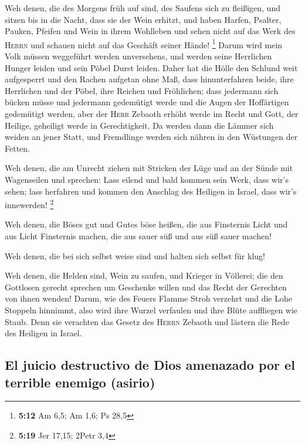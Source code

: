  Weh denen, die des Morgens früh auf sind, des Saufens
sich zu fleißigen, und sitzen bis in die Nacht, dass sie der Wein
erhitzt,  und haben Harfen, Psalter, Pauken, Pfeifen und
Wein in ihrem Wohlleben und sehen nicht auf das Werk des \textsc{Herrn}
und schauen nicht auf das Geschäft seiner Hände! \footnote{\textbf{5:12}
  Am 6,5; Am 1,6; Ps 28,5}  Darum wird mein Volk müssen
weggeführt werden unversehens, und werden seine Herrlichen Hunger leiden
und sein Pöbel Durst leiden.  Daher hat die Hölle den
Schlund weit aufgesperrt und den Rachen aufgetan ohne Maß, dass
hinunterfahren beide, ihre Herrlichen und der Pöbel, ihre Reichen und
Fröhlichen;  dass jedermann sich bücken müsse und
jedermann gedemütigt werde und die Augen der Hoffärtigen gedemütigt
werden,  aber der \textsc{Herr} Zebaoth erhöht werde im
Recht und Gott, der Heilige, geheiligt werde in Gerechtigkeit.
 Da werden dann die Lämmer sich weiden an jener Statt,
und Fremdlinge werden sich nähren in den Wüstungen der Fetten.

 Weh denen, die am Unrecht ziehen mit Stricken der Lüge
und an der Sünde mit Wagenseilen  und sprechen: Lass
eilend und bald kommen sein Werk, dass wir's sehen; lass herfahren und
kommen den Anschlag des Heiligen in Israel, dass wir's innewerden!
\footnote{\textbf{5:19} Jer 17,15; 2Petr 3,4}

 Weh denen, die Böses gut und Gutes böse heißen, die aus
Finsternis Licht und aus Licht Finsternis machen, die aus sauer süß und
aus süß sauer machen!

 Weh denen, die bei sich selbst weise sind und halten
sich selbst für klug!

 Weh denen, die Helden sind, Wein zu saufen, und Krieger
in Völlerei;  die den Gottlosen gerecht sprechen um
Geschenke willen und das Recht der Gerechten von ihnen wenden!
 Darum, wie des Feuers Flamme Stroh verzehrt und die Lohe
Stoppeln hinnimmt, also wird ihre Wurzel verfaulen und ihre Blüte
auffliegen wie Staub. Denn sie verachten das Gesetz des \textsc{Herrn}
Zebaoth und lästern die Rede des Heiligen in Israel.

\hypertarget{el-juicio-destructivo-de-dios-amenazado-por-el-terrible-enemigo-asirio}{%
\subsection{El juicio destructivo de Dios amenazado por el terrible
enemigo
(asirio)}\label{el-juicio-destructivo-de-dios-amenazado-por-el-terrible-enemigo-asirio}}

